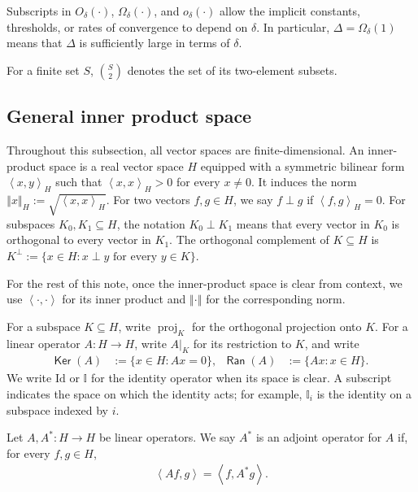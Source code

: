 \documentclass[a4paper,12pt]{article}
\theoremstyle{plain}
\theoremstyle{definition}
\newcommand{\norm}[1]{\left\Vert#1\right\Vert}
\newcommand{\inner}[2]{\left\langle #1,#2\right\rangle}
\newcommand{\Ker}{\mathsf{Ker}\;}
\newcommand{\Ran}{\mathsf{Ran}\;}
\begin{document}
Subscripts in $O_\delta(\cdot)$, $\Omega_\delta(\cdot)$, and
$o_\delta(\cdot)$ allow the implicit constants, thresholds, or rates of
convergence to depend on $\delta$.  In particular,
$\Delta=\Omega_\delta(1)$ means that $\Delta$ is sufficiently large in
terms of $\delta$.

For a finite set $S$, $\binom{S}{2}$ denotes the set of its two-element
subsets.

\subsection{General inner product space}
Throughout this subsection, all vector spaces are finite-dimensional.  An
inner-product space is a real vector space $H$ equipped with a symmetric
bilinear form $\inner{x}{y}_H$ such that $\inner{x}{x}_H>0$ for every
$x\neq0$.  It induces the norm $\norm{x}_H:=\sqrt{\inner{x}{x}_H}$.
For two vectors $f,g\in H$, we say $f\perp g$ if $\inner{f}{g}_H=0$.
For subspaces $K_0,K_1\subseteq H$, the notation $K_0\perp K_1$ means
that every vector in $K_0$ is orthogonal to every vector in $K_1$.  The
orthogonal complement of $K\subseteq H$ is
$K^\perp:=\{x\in H:x\perp y\text{ for every }y\in K\}$.
\begin{remark}
  For the rest of this note, once the inner-product space is clear from
  context, we use $\inner{\cdot}{\cdot}$ for its inner product and
  $\norm{\cdot}$ for the corresponding norm.
\end{remark}

For a subspace $K\subseteq H$, write $\operatorname{proj}_K$ for the
orthogonal projection onto $K$.  For a linear operator $A:H\to H$, write
$A|_K$ for its restriction to $K$, and write
\begin{align*}
  \Ker(A)&:=\{x\in H:Ax=0\},
  &\Ran(A)&:=\{Ax:x\in H\}.
\end{align*}
We write $\mathrm{Id}$ or $\mathbb I$ for the identity operator when its
space is clear.  A subscript indicates the space on which the identity
acts; for example, $\mathbb I_i$ is the identity on a subspace indexed by
$i$.

\begin{definition}
  Let $A, A^*:H\to H$ be linear operators.
  We say $A^*$ is an adjoint operator for $A$ if, for every $f,g\in H$,
  \begin{align*}
    \inner{Af}{g} = \inner{f}{A^*g}.
  \end{align*}
\end{definition}
\end{document}
